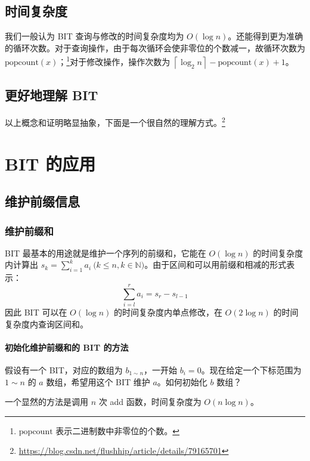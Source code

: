 \documentclass[UTF8]{article}
\newcommand \code[1] {\colorbox[RGB]{245,245,245}{\Consolas #1}}
\begin{document}
	\subsection{时间复杂度}

	我们一般认为 BIT 查询与修改的时间复杂度均为 $O(\log n)$。还能得到更为准确的循环次数。对于查询操作，由于每次循环会使非零位的个数减一，故循环次数为 $\mathrm{popcount}(x)$；\footnote{$\mathrm{popcount}$ 表示二进制数中非零位的个数。}对于修改操作，操作次数为 $\left\lceil \log_2 n \right\rceil - \mathrm{popcount}(x) + 1$。

	\subsection{更好地理解 BIT}

	以上概念和证明略显抽象，下面是一个很自然的理解方式。\footnote{\url{https://blog.csdn.net/flushhip/article/details/79165701}}

	\section{BIT 的应用}

	\subsection{维护前缀信息}

	\subsubsection{维护前缀和}

	BIT 最基本的用途就是维护一个序列的前缀和，它能在 $O(\log n)$ 的时间复杂度内计算出 $s_k = \sum_{i = 1}^{k} a_i \pod {k \le n, k \in \mathbb{N}}$。由于区间和可以用前缀和相减的形式表示：
	$$
	\sum_{i = l}^{r} a_i = s_r - s_{l - 1}
	$$
	因此 BIT 可以在 $O(\log n)$ 的时间复杂度内单点修改，在 $O(2 \log n)$ 的时间复杂度内查询区间和。

	\paragraph{初始化维护前缀和的 BIT 的方法}

	假设有一个 BIT，对应的数组为 $b_{1 \sim n}$，一开始 $b_i = 0$。现在给定一个下标范围为 $1 \sim n$ 的 $a$ 数组，希望用这个 BIT 维护 $a$。如何初始化 $b$ 数组？

	一个显然的方法是调用 $n$ 次 \code{add} 函数，时间复杂度为 $O(n \log n)$。
\end{document}

